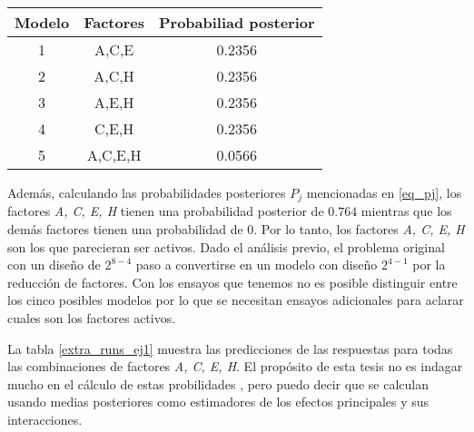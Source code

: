\begin{center}
	\begin{tabular}{ccc}
		Modelo & Factores & Probabiliad posterior \\
		\hline
		1 & A,C,E & 0.2356 \\
		
		2 & A,C,H & 0.2356 \\
		
		3 & A,E,H & 0.2356 \\
		
		4 & C,E,H & 0.2356 \\
		
		5 & A,C,E,H & 0.0566 \\
		
	\end{tabular}
	 \label{modelos_prob_post}
\end{center}

Además, calculando las probabilidades posteriores $P_j$ mencionadas en \ref{eq_pj}, los factores \textit{A, C, E,  H} tienen una probabilidad posterior de $0.764$ mientras que los demás factores tienen una probabilidad de $0$. Por lo tanto, los factores \textit{A, C, E,  H} son los que parecieran ser activos. Dado el análisis previo, el problema original con un diseño de $2^{8-4}$ paso a convertirse en un modelo con diseño $2^{4-1}$ por la reducción de factores. Con los ensayos que tenemos no es posible distinguir entre los cinco posibles modelos por lo que se necesitan ensayos adicionales para aclarar cuales son los factores activos. 

La tabla \ref{extra_runs_ej1} muestra las predicciones de las respuestas para todas las combinaciones de factores \textit{A, C, E,  H}. El propósito de esta tesis no es indagar mucho en el cálculo de estas probilidades , pero puedo decir que se calculan usando medias posteriores como estimadores de los efectos principales y sus interacciones. 

